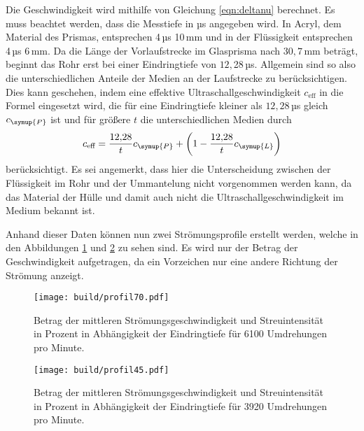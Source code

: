 Die Geschwindigkeit wird mithilfe von Gleichung \eqref{eqn:deltanu} berechnet.
Es muss beachtet werden, dass die Messtiefe in µs angegeben wird. In Acryl, dem Material
des Prismas, entsprechen 4\,µs 10\,mm und in der Flüssigkeit entsprechen 4\,µs 6\,mm.
Da die Länge der Vorlaufstrecke im Glasprisma nach \cite{Versuchsanleitung} $30{,}7$\,mm
beträgt, beginnt das Rohr erst bei einer Eindringtiefe von $12{,}$28\,µs. Allgemein
sind so also die unterschiedlichen Anteile der Medien an der Laufstrecke zu berücksichtigen.
Dies kann geschehen, indem eine effektive Ultraschallgeschwindigkeit $c_\text{eff}$ in die Formel
eingesetzt wird, die für eine Eindringtiefe kleiner als $12{,}28$\,µs gleich $c_{\symup{P}}$
ist und für größere $t$ die unterschiedlichen Medien durch
\begin{equation}
  c_\text{eff} = \frac{12{,}28}{t} c_{\symup{P}} + \left(1-\frac{12{,}28}{t} c_{\symup{L}} \right)
\end{equation}
berücksichtigt. Es sei angemerkt, dass hier die Unterscheidung zwischen der Flüssigkeit im Rohr
und der Ummantelung nicht vorgenommen werden kann, da das Material der Hülle und damit auch nicht die
Ultraschallgeschwindigkeit im Medium bekannt ist.

Anhand dieser Daten können nun zwei Strömungsprofile erstellt werden, welche in den
Abbildungen \ref{fig:profil70} und \ref{fig:profil45} zu sehen sind. Es wird nur
der Betrag der Geschwindigkeit aufgetragen, da ein Vorzeichen nur eine andere Richtung der
Strömung anzeigt.


\begin{figure}
  \centering
  \texttt{[image: build/profil70.pdf]}
  \caption{Betrag der mittleren Strömungsgeschwindigkeit und Streuintensität in Prozent
  in Abhängigkeit der Eindringtiefe für 6100 Umdrehungen pro Minute.}
  \label{fig:profil70}
\end{figure}

\begin{figure}
  \centering
  \texttt{[image: build/profil45.pdf]}
  \caption{Betrag der mittleren Strömungsgeschwindigkeit und Streuintensität in Prozent
  in Abhängigkeit der Eindringtiefe für 3920 Umdrehungen pro Minute.}
  \label{fig:profil45}
\end{figure}
